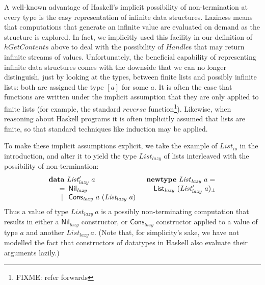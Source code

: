 \documentclass{jfp1}
\newcommand{\kw}[1]{\textbf{#1}}
\begin{document}
A well-known advantage of Haskell's implicit possibility of
non-termination at every type is the easy representation of infinite
data structures. Laziness means that computations that generate an
infinite value are evaluated on demand as the structure is
explored. In fact, we implicitly used this facility in our definition
of $\mathit{hGetContents}$ above to deal with the possibility of
$\mathit{Handle}$s that may return infinite streams of
values. Unfortunately, the beneficial capability of representing
infinite data structures comes with the downside that we can no longer
distinguish, just by looking at the types, between finite lists and
possibly infinite lists: both are assigned the type $[a]$ for some
$a$. It is often the case that functions are written under the
implicit assumption that they are only applied to finite lists (for
example, the standard $\mathit{reverse}$ function\footnote{FIXME:
  refer forwards}). Likewise, when reasoning about Haskell programs it
is often implicitly assumed that lists are finite, so that standard
techniques like induction may be applied.

To make these implicit assumptions explicit, we take the example of
$\mathit{List_{io}}$ in the introduction, and alter it to yield the
type $\mathit{List_{lazy}}$ of lists interleaved with the possibility
of non-termination:
\begin{displaymath}
  \begin{array}{ll}
    \kw{data}~\mathit{List'_{\mathit{lazy}}}~a
    &
    \kw{newtype}~\mathit{List}_{\mathit{lazy}}~a =
    \\
    \quad
    \begin{array}[t]{c@{\hspace{0.5em}}l}
      = & \mathsf{Nil_{\mathit{lazy}}} \\
      | & \mathsf{Cons_{\mathit{lazy}}}~a~(\mathit{List_{lazy}}~a) \\
    \end{array}
    &
    \quad \mathsf{List}_{\mathit{lazy}}~(\mathit{List'_{lazy}}~a)_\bot
  \end{array}
\end{displaymath}
Thus a value of type $\mathit{List_{lazy}}~a$ is a possibly
non-terminating computation that results in either a
$\mathsf{Nil}_{\mathit{lazy}}$ constructor, or
$\mathsf{Cons}_{\mathit{lazy}}$ constructor applied to a value of type
$a$ and another $\mathit{List_{lazy}}~a$. (Note that, for simplicity's
sake, we have not modelled the fact that constructors of datatypes in
Haskell also evaluate their arguments lazily.)
\end{document}
